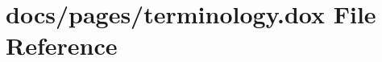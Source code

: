 \hypertarget{terminology_8dox}{\section{docs/pages/terminology.dox File Reference}
\label{terminology_8dox}
}
